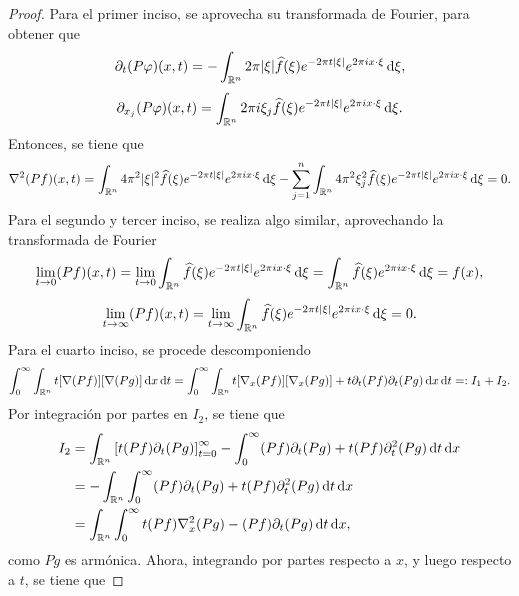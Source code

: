 \begin{proof}
	Para el primer inciso, se aprovecha su transformada de Fourier, para obtener que 
		\begin{equation*}
		\partial_t (P\varphi)(x, t) = - \int_{\mathbb{R}^n} 2\pi|\xi| \widehat{f}(\xi) e^{-2\pi t |\xi|} e^{2\pi ix \cdot \xi} \mathop{}\!\mathrm{d} \xi,
	\end{equation*}
	\begin{equation*}
		\partial_{x_j} (P\varphi)(x, t) = \int_{\mathbb{R}^n} 2\pi i\xi_j\widehat{f}(\xi) e^{-2\pi t |\xi|} e^{2\pi ix \cdot \xi} \mathop{}\!\mathrm{d} \xi.
	\end{equation*}
	Entonces, se tiene que 
	\begin{equation*}
		\nabla^2(Pf)(x, t) = \int_{\mathbb{R}^n} 4\pi^2|\xi|^2 \widehat{f}(\xi) e^{-2\pi t |\xi|} e^{2\pi ix \cdot \xi} \mathop{}\!\mathrm{d} \xi - \sum_{j=1}^n \int_{\mathbb{R}^n} 4\pi^2 \xi_j^2\widehat{f}(\xi) e^{-2\pi t |\xi|} e^{2\pi ix \cdot \xi} \mathop{}\!\mathrm{d} \xi = 0.
	\end{equation*}
	Para el segundo y tercer inciso, se realiza algo similar, aprovechando la transformada de Fourier
	\begin{equation*}
		\lim_{t\to0} (Pf)(x, t) = \lim_{t\to0} \int_{\mathbb{R}^n} \widehat{f}(\xi) e^{-2\pi t |\xi|} e^{2\pi ix \cdot \xi} \mathop{}\!\mathrm{d} \xi = \int_{\mathbb{R}^n} \widehat{f}(\xi)  e^{2\pi ix \cdot \xi} \mathop{}\!\mathrm{d} \xi = f(x),
	\end{equation*}
	\begin{equation*}
		\lim_{t\to\infty} (Pf)(x, t) = \lim_{t\to\infty} \int_{\mathbb{R}^n} \widehat{f}(\xi) e^{-2\pi t |\xi|} e^{2\pi ix \cdot \xi} \mathop{}\!\mathrm{d} \xi =0.
	\end{equation*}
	Para el cuarto inciso, se procede descomponiendo
	\begin{equation*}
		 \int_0^\infty\int_{\mathbb{R}^n} t[\nabla(Pf)][\nabla(Pg)]\mathop{}\!\mathrm{d} x \mathop{}\!\mathrm{d} t = \int_0^\infty\int_{\mathbb{R}^n} t[\nabla_x(Pf)][\nabla_x(Pg)] + t\partial_t(Pf)\partial_t(Pg)\mathop{}\!\mathrm{d} x \mathop{}\!\mathrm{d} t =: I_1+I_2.
	\end{equation*}
	Por integración por partes en $I_2$, se tiene que
	\begin{align*}
		I_2& = \int_{\mathbb{R}^n} \left[ t(Pf)\partial_t(Pg) 
		\right]_{t=0}^\infty - \int_0^\infty (Pf)\partial_t(Pg) + t(Pf)\partial^2_t(Pg)\mathop{}\!\mathrm{d} t \mathop{}\!\mathrm{d} x \\  
		& =- \int_{\mathbb{R}^n}  \int_0^\infty (Pf)\partial_t(Pg) + t(Pf)\partial^2_t(Pg)\mathop{}\!\mathrm{d} t \mathop{}\!\mathrm{d} x\\
		&= \int_{\mathbb{R}^n}  \int_0^\infty   t(Pf)\nabla^2_x(Pg)-(Pf)\partial_t(Pg)\mathop{}\!\mathrm{d} t \mathop{}\!\mathrm{d} x,
	\end{align*}
	como $Pg$ es armónica. Ahora, integrando por partes respecto a $x$, y luego respecto a $t$, se tiene que

\end{proof}
